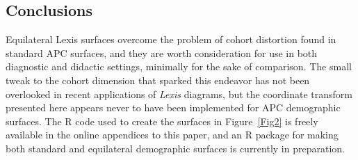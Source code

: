 \documentclass[a4paper]{article}
\begin{document}
\subsection*{Conclusions}
Equilateral Lexis surfaces overcome the problem of cohort distortion found in standard APC surfaces, and they are worth consideration for use in both diagnostic and didactic settings, minimally for the sake of comparison. The small tweak to the cohort dimension that sparked this endeavor has not been overlooked in recent applications of \textit{Lexis} diagrams, but the coordinate transform presented here appears never to have been implemented for APC demographic surfaces. The R code used to create the surfaces in Figure~\ref{Fig2} is freely available in the online appendices to this paper, and an R package for making both standard and equilateral demographic surfaces is currently in preparation.


   
\end{document}
